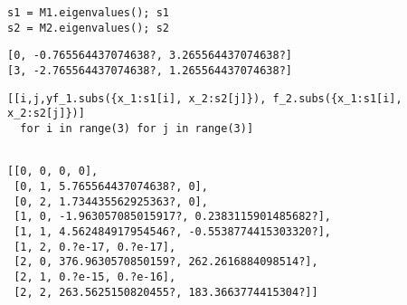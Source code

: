 \documentclass[dvipdfmx,11pat]{jarticle}
\begin{document}
\begin{verbatim}
s1 = M1.eigenvalues(); s1
s2 = M2.eigenvalues(); s2

\end{verbatim}

\label{org0d842d5}
\begin{verbatim}
[0, -0.765564437074638?, 3.265564437074638?]
[3, -2.765564437074638?, 1.265564437074638?]
\end{verbatim}


\begin{verbatim}
[[i,j,yf_1.subs({x_1:s1[i], x_2:s2[j]}), f_2.subs({x_1:s1[i], x_2:s2[j]})] 
  for i in range(3) for j in range(3)]
\end{verbatim}

\label{org4d43167}
\begin{verbatim}

[[0, 0, 0, 0],
 [0, 1, 5.765564437074638?, 0],
 [0, 2, 1.734435562925363?, 0],
 [1, 0, -1.963057085015917?, 0.2383115901485682?],
 [1, 1, 4.562484917954546?, -0.5538774415303320?],
 [1, 2, 0.?e-17, 0.?e-17],
 [2, 0, 376.9630570850159?, 262.2616884098514?],
 [2, 1, 0.?e-15, 0.?e-16],
 [2, 2, 263.5625150820455?, 183.3663774415304?]]
\end{verbatim}
\end{document}
